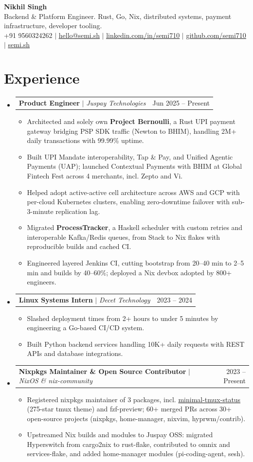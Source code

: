 \documentclass[letterpaper,12pt]{article}
\makeatletter
\newcommand{\resumeItem}[1]{
  \item \small\justifying #1
}
\newcommand{\resumeSubheading}[4]{
  \vspace{2pt}\item
    \begin{tabular*}{0.97\textwidth}[t]{l@{\extracolsep{\fill}}r}
      \textbf{#1} $|$ \emph{#3} & #2 \\
    \end{tabular*}\vspace{0pt}
}
\newcommand{\resumeSubHeadingListStart}{\begin{itemize}[leftmargin=0.15in, label={}]}
\newcommand{\resumeSubHeadingListEnd}{\end{itemize}}
\newcommand{\resumeItemListStart}{\begin{itemize}[topsep=1pt, partopsep=0pt, parsep=1pt, itemsep=1pt]\justifying}
\newcommand{\resumeItemListEnd}{\end{itemize}\vspace{-4pt}}
\makeatother
\begin{document}
\begin{center}
\textbf{\huge Nikhil Singh} \\ \vspace{3pt}
\small Backend \& Platform Engineer. Rust, Go, Nix, distributed systems, payment infrastructure, developer tooling. \\ \vspace{2pt}
\small +91 9560324262 $|$ \href{mailto:hello@semi.sh}{\underline{hello@semi.sh}} $|$
\href{https://linkedin.com/in/semi710}{\underline{linkedin.com/in/semi710}} $|$
\href{https://github.com/semi710}{\underline{github.com/semi710}} $|$
\href{https://semi.sh}{\underline{semi.sh}}
\end{center}
\vspace{-18pt}

\section{Experience}
\resumeSubHeadingListStart
\resumeSubheading
{Product Engineer}{Jun 2025 -- Present}
{Juspay Technologies}{Bengaluru, KA}
\resumeItemListStart
\resumeItem{Architected and solely own \textbf{Project Bernoulli}, a Rust UPI payment gateway bridging PSP SDK traffic (Newton to BHIM), handling 2M+ daily transactions with 99.99\% uptime.}
\resumeItem{Built UPI Mandate interoperability, Tap \& Pay, and Unified Agentic Payments (UAP); launched Contextual Payments with BHIM at Global Fintech Fest across 4 merchants, incl. Zepto and Vi.}
\resumeItem{Helped adopt active-active cell architecture across AWS and GCP with per-cloud Kubernetes clusters, enabling zero-downtime failover with sub-3-minute replication lag.}
\resumeItem{Migrated \textbf{ProcessTracker}, a Haskell scheduler with custom retries and interoperable Kafka/Redis queues, from Stack to Nix flakes with reproducible builds and cached CI.}
\resumeItem{Engineered layered Jenkins CI, cutting bootstrap from 20--40 min to 2--5 min and builds by 40--60\%; deployed a Nix devbox adopted by 800+ engineers.}
\resumeItemListEnd

\resumeSubheading
{Linux Systems Intern}{2023 -- 2024}
{Decet Technology}{Remote \& Greater Noida}
\resumeItemListStart
\resumeItem{Slashed deployment times from 2+ hours to under 5 minutes by engineering a Go-based CI/CD system.}
\resumeItem{Built Python backend services handling 10K+ daily requests with REST APIs and database integrations.}
\resumeItemListEnd

\resumeSubheading
{Nixpkgs Maintainer \& Open Source Contributor}{2023 -- Present}
{NixOS \& nix-community}{Remote}
\resumeItemListStart
\resumeItem{Registered nixpkgs maintainer of 3 packages, incl. \href{https://github.com/semi710/minimal-tmux-status}{minimal-tmux-status} (275-star tmux theme) and fzf-preview; 60+ merged PRs across 30+ open-source projects (nixpkgs, home-manager, nixvim, hyprwm/contrib).}
\resumeItem{Upstreamed Nix builds and modules to Juspay OSS: migrated Hyperswitch from cargo2nix to rust-flake, contributed to omnix and services-flake, and added home-manager modules (pi-coding-agent, sesh).}
\resumeItemListEnd
\resumeSubHeadingListEnd
\end{document}
